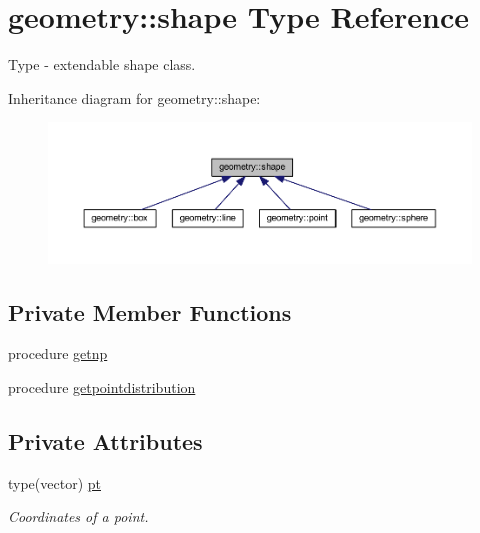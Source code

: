 \hypertarget{structgeometry_1_1shape}{}\section{geometry\+:\+:shape Type Reference}
\label{structgeometry_1_1shape}


Type -\/ extendable shape class.  




Inheritance diagram for geometry\+:\+:shape\+:\nopagebreak
\begin{figure}[H]
\begin{center}
\leavevmode
\includegraphics[width=350pt]{structgeometry_1_1shape__inherit__graph}
\end{center}
\end{figure}
\subsection*{Private Member Functions}
\begin{DoxyCompactItemize}
\item 
procedure \mbox{\hyperlink{structgeometry_1_1shape_ad661871b6433bc48b165c400524dde90}{getnp}}
\item 
procedure \mbox{\hyperlink{structgeometry_1_1shape_a9df712486b716b472955c14057eab7ff}{getpointdistribution}}
\end{DoxyCompactItemize}
\subsection*{Private Attributes}
\begin{DoxyCompactItemize}
\item 
type(vector) \mbox{\hyperlink{structgeometry_1_1shape_aada595aa3503cf22350737caf2931e6a}{pt}}
\begin{DoxyCompactList}\small\item\em Coordinates of a point. \end{DoxyCompactList}\end{DoxyCompactItemize}


